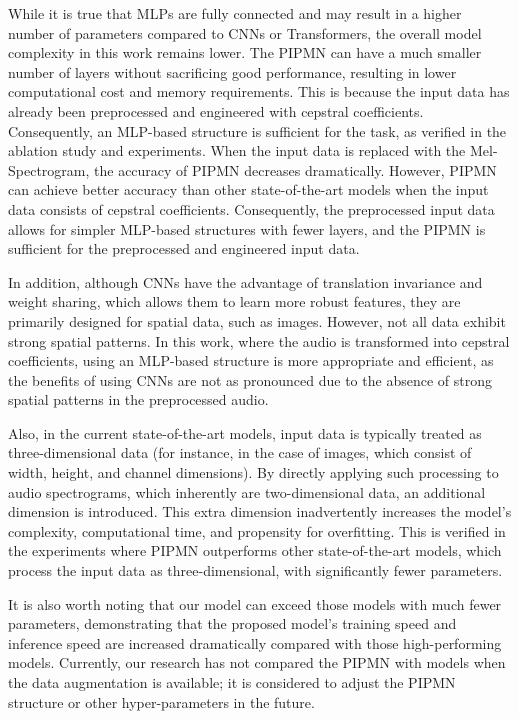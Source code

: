 \documentclass[runningheads]{llncs}
\begin{document}
While it is true that MLPs are fully connected and may result in a higher number of parameters compared to CNNs or Transformers, the overall model complexity in this work remains lower. The PIPMN can have a much smaller number of layers without sacrificing good performance, resulting in lower computational cost and memory requirements. This is because the input data has already been preprocessed and engineered with cepstral coefficients. Consequently, an MLP-based structure is sufficient for the task, as verified in the ablation study and experiments. When the input data is replaced with the Mel-Spectrogram, the accuracy of PIPMN decreases dramatically. However, PIPMN can achieve better accuracy than other state-of-the-art models when the input data consists of cepstral coefficients. Consequently, the preprocessed input data allows for simpler MLP-based structures with fewer layers, and the PIPMN is sufficient for the preprocessed and engineered input data.

In addition, although CNNs have the advantage of translation invariance and weight sharing, which allows them to learn more robust features, they are primarily designed for spatial data, such as images. However, not all data exhibit strong spatial patterns. In this work, where the audio is transformed into cepstral coefficients, using an MLP-based structure is more appropriate and efficient, as the benefits of using CNNs are not as pronounced due to the absence of strong spatial patterns in the preprocessed audio.

Also, in the current state-of-the-art models, input data is typically treated as three-dimensional data (for instance, in the case of images, which consist of width, height, and channel dimensions). By directly applying such processing to audio spectrograms, which inherently are two-dimensional data, an additional dimension is introduced. This extra dimension inadvertently increases the model's complexity, computational time, and propensity for overfitting. This is verified in the experiments where PIPMN outperforms other state-of-the-art models, which process the input data as three-dimensional, with significantly fewer parameters.

It is also worth noting that our model can exceed those models with much fewer parameters, demonstrating that the proposed model's training speed and inference speed are increased dramatically compared with those high-performing models.  Currently, our research has not compared the PIPMN with models when the data augmentation is available; it is considered to adjust the PIPMN structure or other hyper-parameters in the future.
\end{document}
